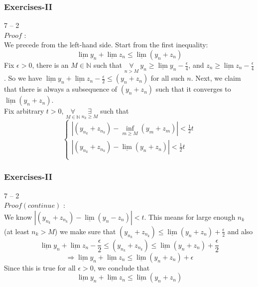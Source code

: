 \documentclass[12pt, t]{beamer}
\begin{document}
\begin{frame}
    \frametitle{Exercises-II}
7 -- 2\\
$Proof$ : \\
\hspace{1em} We precede from the left-hand side. Start from the first inequality: 
\begin{equation*}
    \underline{\lim}y_n+\underline{\lim}z_n\leq \underline{\lim} (y_n+z_n) 
\end{equation*}
\hspace{1em} Fix $\epsilon>0$, there is an $M\in \mathbb{N}$ such that $\underset{n>M}{\forall}\ y_n\geq \underline{\lim}y_n-\frac{\epsilon}{4}$, and 
$z_n \geq \underline{\lim}z_n-\frac{\epsilon}{4}$. So we have $\underline{\lim}y_n+\underline{\lim}z_n-\frac{\epsilon}{2}\leq(y_n+z_n)$ for all such $n$. 
Next, we claim that there is always a subsequence of $(y_n+z_n)$ such that it converges to $\underline{\lim}(y_n+z_n)$.\\
\hspace{1em} Fix arbitrary $t>0$, $\underset{M\in\mathbb{N}}{\forall}\ \underset{n_k\geq M}{\exists}$ such that 
\begin{equation*}
    \begin{cases}
    |(y_{n_k}+z_{n_k})-\inf_{m\geq M}(y_m+z_m)|<\frac{1}{2}t\\
    |(y_{n_k}+z_{n_k})-\underline{\lim}(y_n+z_n)|<\frac{1}{2}t\\
\end{cases}
\end{equation*}
 

\end{frame}

\begin{frame}
    \frametitle{Exercises-II}
7 -- 2\\
$Proof(continue)$ : \\
\hspace{1em} We know $|(y_{n_k}+z_{n_k})-\underline{\lim}(y_n-z_n)|<t$. This means for large enough $n_k$ (at least $n_k>M$) we make sure that 
$(y_{n_k}+z_{n_k})\leq \underline{\lim}(y_n+z_n)+\frac{\epsilon}{2}$ and also 
\begin{equation*}
        \underline{\lim}y_n+\underline{\lim}z_n-\frac{\epsilon}{2}\leq (y_{n_k}+z_{n_k})\leq \underline{\lim}(y_n+z_n)+\frac{\epsilon}{2}
\end{equation*}
\begin{equation*}
    \Rightarrow \underline{\lim}y_n+\underline{\lim}z_n\leq \underline{\lim}(y_n+z_n)+\epsilon
\end{equation*}
\hspace{1em} Since this is true for all $\epsilon>0$, we conclude that
\begin{equation*}
    \underline{\lim}y_n+\underline{\lim}z_n\leq \underline{\lim}(y_n+z_n)
\end{equation*}

\end{frame}
\end{document}
